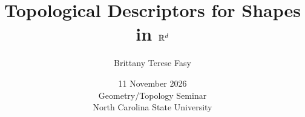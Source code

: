 \documentclass{beamer}
\title{Topological Descriptors for Shapes in ${\mathbb R}^d$}
\author[B.\ Fasy]{Brittany Terese Fasy}
\institute[MSU]{Associate Professor, Montana State University}
\date[11 November 2026]{11 November 2026\\
Geometry/Topology Seminar\\
North Carolina State University}
\begin{document}
\begin{frame}
\titlepage
\end{frame}







\end{document}
